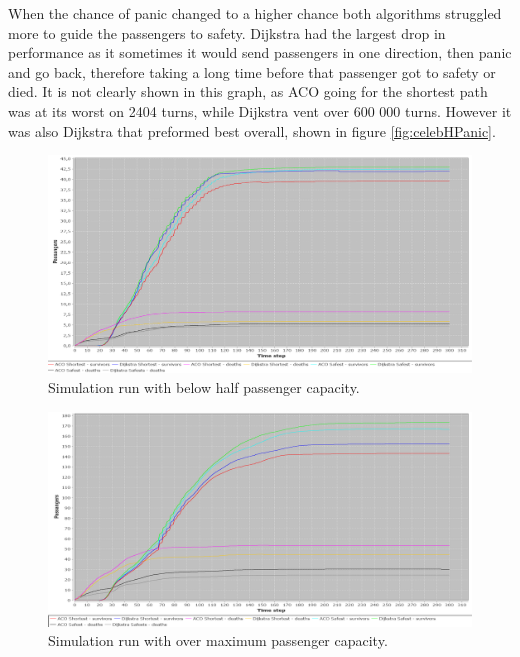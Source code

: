 When the chance of panic changed to a higher chance both algorithms struggled more to guide the passengers to safety. Dijkstra had the largest drop in performance as it sometimes it would send passengers in one direction, then panic and go back, therefore taking a long time before that passenger got to safety or died. It is not clearly shown in this graph, as ACO going for the shortest path was at its worst on 2404 turns, while Dijkstra vent over 600 000 turns. However it was also Dijkstra that preformed best overall, shown in figure \ref{fig:celebHPanic}.

\begin{figure} [h]
\centering
\hspace*{-1.0in}
\includegraphics[scale=0.35]{images/Graph-using-200-rounds-50-passangers.png}
\caption{Simulation run with below half passenger capacity.}
\label{fig:celeb50}
\end{figure}

\begin{figure} [h]
\centering
\hspace*{-1.0in}
\includegraphics[scale=0.35]{images/Graph-using-200-rounds-200-passangers.png}
\caption{Simulation run with over maximum passenger capacity.}
\label{fig:celeb200}
\end{figure}

